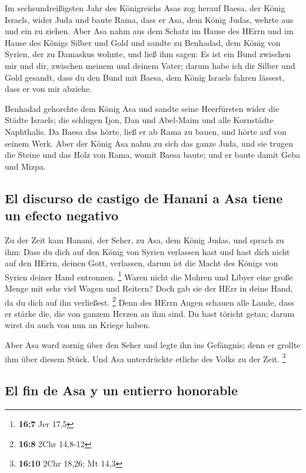  Im sechsundreißigsten Jahr des Königreichs Asas zog
herauf Baesa, der König Israels, wider Juda und baute Rama, dass er Asa,
dem König Judas, wehrte aus und ein zu ziehen.  Aber Asa
nahm aus dem Schatz im Hause des HErrn und im Hause des Königs Silber
und Gold und sandte zu Benhadad, dem König von Syrien, der zu Damaskus
wohnte, und ließ ihm sagen:  Es ist ein Bund zwischen mir
und dir, zwischen meinem und deinem Vater; darum habe ich dir Silber und
Gold gesandt, dass du den Bund mit Baesa, dem König Israels fahren
lässest, dass er von mir abziehe.

 Benhadad gehorchte dem König Asa und sandte seine
Heerfürsten wider die Städte Israels; die schlugen Ijon, Dan und
Abel-Maim und alle Kornstädte Naphthalis.  Da Baesa das
hörte, ließ er ab Rama zu bauen, und hörte auf von seinem Werk.
 Aber der König Asa nahm zu sich das ganze Juda, und sie
trugen die Steine und das Holz von Rama, womit Baesa baute; und er baute
damit Geba und Mizpa.

\hypertarget{el-discurso-de-castigo-de-hanani-a-asa-tiene-un-efecto-negativo}{%
\subsection{El discurso de castigo de Hanani a Asa tiene un efecto
negativo}\label{el-discurso-de-castigo-de-hanani-a-asa-tiene-un-efecto-negativo}}

 Zu der Zeit kam Hanani, der Seher, zu Asa, dem König
Judas, und sprach zu ihm: Dass du dich auf den König von Syrien
verlassen hast und hast dich nicht auf den HErrn, deinen Gott,
verlassen, darum ist die Macht des Königs von Syrien deiner Hand
entronnen. \footnote{\textbf{16:7} Jer 17,5}  Waren nicht
die Mohren und Libyer eine große Menge mit sehr viel Wagen und Reitern?
Doch gab sie der HErr in deine Hand, da du dich auf ihn verließest.
\footnote{\textbf{16:8} 2Chr 14,8-12}  Denn des HErrn
Augen schauen alle Lande, dass er stärke die, die von ganzem Herzen an
ihm sind. Du hast töricht getan; darum wirst du auch von nun an Kriege
haben.

 Aber Asa ward zornig über den Seher und legte ihn ins
Gefängnis; denn er grollte ihm über diesem Stück. Und Asa unterdrückte
etliche des Volks zu der Zeit. \footnote{\textbf{16:10} 2Chr 18,26; Mt
  14,3}

\hypertarget{el-fin-de-asa-y-un-entierro-honorable}{%
\subsection{El fin de Asa y un entierro
honorable}\label{el-fin-de-asa-y-un-entierro-honorable}}

